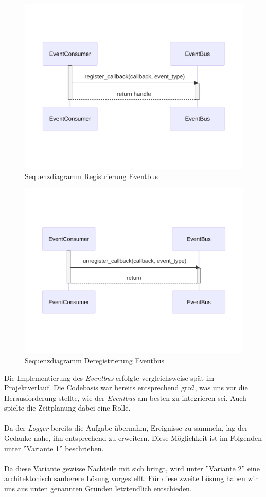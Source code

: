 \begin{figure}[!hb]
	\centering
	\includegraphics[width=0.75\linewidth]{images/diagrams/eventbus-register-seq.png}
	\caption{Sequenzdiagramm Registrierung Eventbus}
	\label{fig:eventbus-register-seq}
\end{figure}

\begin{figure}[!hb]
	\centering
	\includegraphics[width=0.75\linewidth]{images/diagrams/eventbus-unregister-seq.png}
	\caption{Sequenzdiagramm Deregistrierung Eventbus}
	\label{fig:eventbus-unregister-seq}
\end{figure}

Die Implementierung des \emph{Eventbus} erfolgte vergleichsweise spät im Projektverlauf. Die Codebasis war bereits entsprechend groß, was uns vor die Herausforderung stellte, wie der \emph{Eventbus} am besten zu integrieren sei. Auch spielte die Zeitplanung dabei eine Rolle.\\
\\
Da der \emph{Logger}\cite{reisener_entwurf_2023} bereits die Aufgabe übernahm, Ereignisse zu sammeln, lag der Gedanke nahe, ihn entsprechend zu erweitern. Diese Möglichkeit ist im Folgenden unter ''Variante 1'' beschrieben.\\
\\
Da diese Variante gewisse Nachteile mit sich bringt, wird unter ''Variante 2'' eine architektonisch sauberere Lösung vorgestellt. Für diese zweite Lösung haben wir uns aus unten genannten Gründen letztendlich entschieden.

